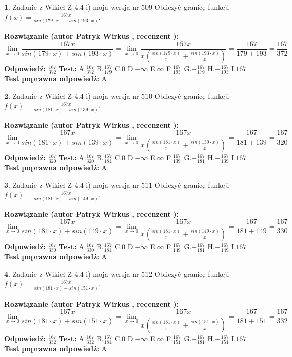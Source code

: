 \documentclass[12pt, a4paper]{article}
\theoremstyle{definition} %
\newtheorem{zad}{}
\newcommand{\zadStart}[1]{\begin{zad}#1\newline}
\newcommand{\zadStop}{\end{zad}}
\newcommand{\rozwStart}[2]{\noindent \textbf{Rozwiązanie (autor #1 , recenzent #2): }\newline}
\newcommand{\rozwStop}{\newline}
\newcommand{\odpStart}{\noindent \textbf{Odpowiedź:}\newline}
\newcommand{\odpStop}{\newline}
\newcommand{\testStart}{\noindent \textbf{Test:}\newline}
\newcommand{\testStop}{\newline}
\newcommand{\kluczStart}{\noindent \textbf{Test poprawna odpowiedź:}\newline}
\newcommand{\kluczStop}{\newline}
\begin{document}
\zadStart{Zadanie z Wikieł Z 4.4 i) moja wersja nr 509}
Obliczyć granicę funkcji $f(x)=\frac{167x}{sin(179\cdot x) +sin(193\cdot x)}$.
\zadStop
\rozwStart{Patryk Wirkus}{}
$$\lim\limits_{x\to 0}\frac{167x}{sin(179\cdot x) +sin(193\cdot x)}=\lim\limits_{x\to 0}\frac{167x}{x(\frac{sin(179\cdot x)}{x}+\frac{sin(193\cdot x)}{x})}=\frac{167}{179+193} = \frac{167}{372}$$
\rozwStop
\odpStart
$\frac{167}{372}$
\odpStop
\testStart
A.$\frac{167}{372}$
B.$\frac{167}{179}$
C.$0$
D.$-\infty$
E.$\infty$
F.$\frac{167}{193}$
G.$-\frac{167}{179}$
H.$-\frac{167}{193}$
I.$167$
\testStop
\kluczStart
A
\kluczStop



\zadStart{Zadanie z Wikieł Z 4.4 i) moja wersja nr 510}
Obliczyć granicę funkcji $f(x)=\frac{167x}{sin(181\cdot x) +sin(139\cdot x)}$.
\zadStop
\rozwStart{Patryk Wirkus}{}
$$\lim\limits_{x\to 0}\frac{167x}{sin(181\cdot x) +sin(139\cdot x)}=\lim\limits_{x\to 0}\frac{167x}{x(\frac{sin(181\cdot x)}{x}+\frac{sin(139\cdot x)}{x})}=\frac{167}{181+139} = \frac{167}{320}$$
\rozwStop
\odpStart
$\frac{167}{320}$
\odpStop
\testStart
A.$\frac{167}{320}$
B.$\frac{167}{181}$
C.$0$
D.$-\infty$
E.$\infty$
F.$\frac{167}{139}$
G.$-\frac{167}{181}$
H.$-\frac{167}{139}$
I.$167$
\testStop
\kluczStart
A
\kluczStop



\zadStart{Zadanie z Wikieł Z 4.4 i) moja wersja nr 511}
Obliczyć granicę funkcji $f(x)=\frac{167x}{sin(181\cdot x) +sin(149\cdot x)}$.
\zadStop
\rozwStart{Patryk Wirkus}{}
$$\lim\limits_{x\to 0}\frac{167x}{sin(181\cdot x) +sin(149\cdot x)}=\lim\limits_{x\to 0}\frac{167x}{x(\frac{sin(181\cdot x)}{x}+\frac{sin(149\cdot x)}{x})}=\frac{167}{181+149} = \frac{167}{330}$$
\rozwStop
\odpStart
$\frac{167}{330}$
\odpStop
\testStart
A.$\frac{167}{330}$
B.$\frac{167}{181}$
C.$0$
D.$-\infty$
E.$\infty$
F.$\frac{167}{149}$
G.$-\frac{167}{181}$
H.$-\frac{167}{149}$
I.$167$
\testStop
\kluczStart
A
\kluczStop



\zadStart{Zadanie z Wikieł Z 4.4 i) moja wersja nr 512}
Obliczyć granicę funkcji $f(x)=\frac{167x}{sin(181\cdot x) +sin(151\cdot x)}$.
\zadStop
\rozwStart{Patryk Wirkus}{}
$$\lim\limits_{x\to 0}\frac{167x}{sin(181\cdot x) +sin(151\cdot x)}=\lim\limits_{x\to 0}\frac{167x}{x(\frac{sin(181\cdot x)}{x}+\frac{sin(151\cdot x)}{x})}=\frac{167}{181+151} = \frac{167}{332}$$
\rozwStop
\odpStart
$\frac{167}{332}$
\odpStop
\testStart
A.$\frac{167}{332}$
B.$\frac{167}{181}$
C.$0$
D.$-\infty$
E.$\infty$
F.$\frac{167}{151}$
G.$-\frac{167}{181}$
H.$-\frac{167}{151}$
I.$167$
\testStop
\kluczStart
A
\kluczStop
\end{document}
